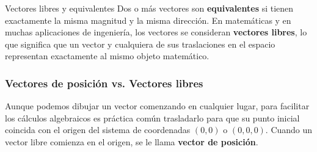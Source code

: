 \begin{mydefinition}{Vectores libres y equivalentes}
Dos o más vectores son \textbf{equivalentes} si tienen exactamente la misma magnitud y la misma dirección. En matemáticas y en muchas aplicaciones de ingeniería, los vectores se consideran \textbf{vectores libres}, lo que significa que un vector y cualquiera de sus traslaciones en el espacio representan exactamente al mismo objeto matemático.
\end{mydefinition}

\subsubsection{Vectores de posición vs. Vectores libres}
Aunque podemos dibujar un vector comenzando en cualquier lugar, para facilitar los cálculos algebraicos es práctica común trasladarlo para que su punto inicial coincida con el origen del sistema de coordenadas $(0,0)$ o $(0,0,0)$. Cuando un vector libre comienza en el origen, se le llama \textbf{vector de posición}.

\begin{center}
\shorthandoff{>}
\end{center}

